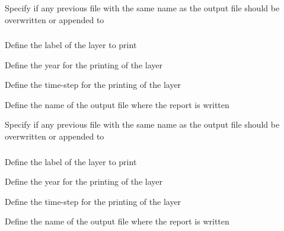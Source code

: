  {Specify if any previous file with the same name as the output file should be overwritten or appended to}

\subsubsection[Print a layer]{}

 {Define the label of the layer to print}

 {Define the year for the printing of the layer}

 {Define the time-step for the printing of the layer}

 {Define the name of the output file where the report is written}

 {Specify if any previous file with the same name as the output file should be overwritten or appended to}

\subsubsection[Print a derived view via a categorical layer]{}

 {Define the label of the layer to print}

 {Define the year for the printing of the layer}

 {Define the time-step for the printing of the layer}

 {Define the name of the output file where the report is written}

